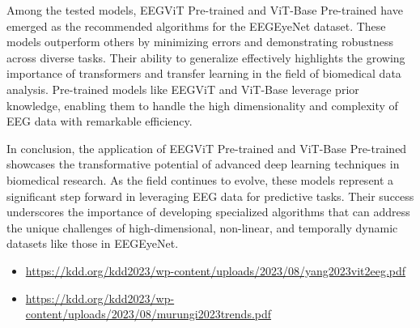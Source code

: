 \documentclass{article}
\begin{document}
Among the tested models, EEGViT Pre-trained and ViT-Base Pre-trained have emerged as the recommended algorithms for the EEGEyeNet dataset. These models outperform others by minimizing errors and demonstrating robustness across diverse tasks. Their ability to generalize effectively highlights the growing importance of transformers and transfer learning in the field of biomedical data analysis. Pre-trained models like EEGViT and ViT-Base leverage prior knowledge, enabling them to handle the high dimensionality and complexity of EEG data with remarkable efficiency.

In conclusion, the application of EEGViT Pre-trained and ViT-Base Pre-trained showcases the transformative potential of advanced deep learning techniques in biomedical research. As the field continues to evolve, these models represent a significant step forward in leveraging EEG data for predictive tasks. Their success underscores the importance of developing specialized algorithms that can address the unique challenges of high-dimensional, non-linear, and temporally dynamic datasets like those in EEGEyeNet.







\begin{itemize}
    \item 
    \url{https://kdd.org/kdd2023/wp-content/uploads/2023/08/yang2023vit2eeg.pdf}
\end{itemize}

\begin{itemize}
    \item 
    \url{https://kdd.org/kdd2023/wp-content/uploads/2023/08/murungi2023trends.pdf}
\end{itemize}
\end{document}
